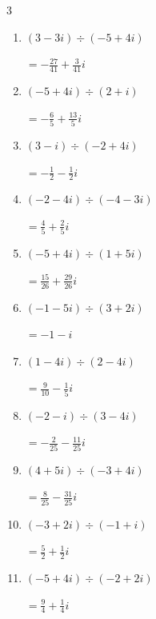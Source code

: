 \begin{multicols}{3}
\begin{enumerate}
        $\displaystyle =\frac{3}{5}+\frac{4}{5}i$

\columnbreak %

\resetques

  \item $\displaystyle (3-3i)\div(-5+4i)$

        $\displaystyle =-\frac{27}{41}+\frac{3}{41}i$

  \item $\displaystyle (-5+4i)\div(2+i)$

        $\displaystyle =-\frac{6}{5}+\frac{13}{5}i$

  \item $\displaystyle (3-i)\div(-2+4i)$

        $\displaystyle =-\frac{1}{2}-\frac{1}{2}i$

  \item $\displaystyle (-2-4i)\div(-4-3i)$

        $\displaystyle =\frac{4}{5}+\frac{2}{5}i$

  \item $\displaystyle (-5+4i)\div(1+5i)$

        $\displaystyle =\frac{15}{26}+\frac{29}{26}i$

  \item $\displaystyle (-1-5i)\div(3+2i)$

        $\displaystyle =-1-i$

  \item $\displaystyle (1-4i)\div(2-4i)$

        $\displaystyle =\frac{9}{10}-\frac{1}{5}i$

  \item $\displaystyle (-2-i)\div(3-4i)$

        $\displaystyle =-\frac{2}{25}-\frac{11}{25}i$

  \item $\displaystyle (4+5i)\div(-3+4i)$

        $\displaystyle =\frac{8}{25}-\frac{31}{25}i$

  \item $\displaystyle (-3+2i)\div(-1+i)$

        $\displaystyle =\frac{5}{2}+\frac{1}{2}i$

\columnbreak %

  \item $\displaystyle (-5+4i)\div(-2+2i)$

        $\displaystyle =\frac{9}{4}+\frac{1}{4}i$


\end{enumerate}
\end{multicols}
